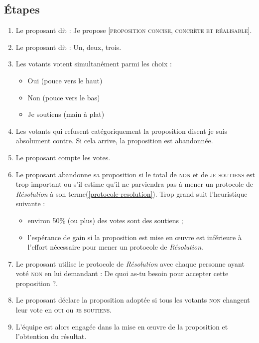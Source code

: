 \documentclass[paper=6in:9in,pagesize=pdftex,headinclude=on,footinclude=on,11pt]{scrbook}
\newcommand*{\numref}[1]{{\hyperref[{#1}]{\autoref*{#1}}}}
\begin{document}
\subsection{Étapes}
\begin{enumerate}
	\item Le proposant dit : \og{}Je propose [\textsc{proposition concise, concrète et réalisable}]\fg{}.
	\item Le proposant dit : \og{}Un, deux, trois\fg{}.
	\item Les votants votent simultanément parmi les choix :
	      \begin{itemize}
	      	\item Oui (pouce vers le haut)
	      	\item Non (pouce vers le bas)
	      	\item Je soutiens (main à plat)
	      \end{itemize}
	\item Les votants qui refusent catégoriquement la proposition disent \og{}je suis absolument contre\fg{}. Si cela arrive, la proposition est abandonnée.
	\item Le proposant compte les votes.
	\item Le proposant abandonne sa proposition si le total de \textsc{non} et de \textsc{je soutiens} est trop important ou s'il estime qu'il ne parviendra
	      pas à mener un protocole de \emph{Résolution} à son terme(\numref{protocole-resolution}). \og{}Trop grand\fg{} suit l'heuristique suivante :
	      \begin{itemize}
	      	\item environ 50\% (ou plus) des votes sont des soutiens ;
	      	\item l'espérance de gain si la proposition est mise en œuvre est inférieure à l'effort nécessaire pour mener un protocole de \emph{Résolution}.
	      \end{itemize}
	\item Le proposant utilise le protocole de \emph{Résolution} avec chaque personne ayant voté \textsc{non} en lui demandant : \og{}De quoi as-tu besoin pour
	      accepter cette proposition ?\fg{}.
	\item Le proposant déclare la proposition adoptée si tous les votants \textsc{non} changent leur vote en \textsc{oui} ou \textsc{je soutiens}.
	\item L'équipe est alors engagée dans la mise en œuvre de la proposition et l'obtention du résultat.
\end{enumerate}
\end{document}
